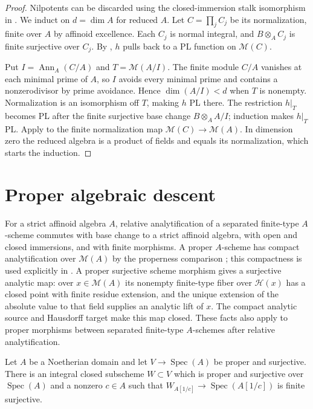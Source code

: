 \documentclass[11pt,a4paper]{amsart}
\begin{document}
\begin{proof}
Nilpotents can be discarded using the closed-immersion stalk isomorphism in . We induct on $d=\dim A$ for reduced $A$. Let $C=\prod_j C_j$ be its normalization, finite over $A$ by affinoid excellence. Each $C_j$ is normal integral, and $B\otimes_A C_j$ is finite surjective over $C_j$. By , $h$ pulls back to a PL function on $\mathcal M(C)$.

Put $I=\operatorname{Ann}_A(C/A)$ and $T=\mathcal M(A/I)$. The finite module $C/A$ vanishes at each minimal prime of $A$, so $I$ avoids every minimal prime and contains a nonzerodivisor by prime avoidance. Hence $\dim(A/I)<d$ when $T$ is nonempty. Normalization is an isomorphism off $T$, making $h$ PL there. The restriction $h|_T$ becomes PL after the finite surjective base change $B\otimes_A A/I$; induction makes $h|_T$ PL. Apply  to the finite normalization map $\mathcal M(C)\to\mathcal M(A)$. In dimension zero the reduced algebra is a product of fields and equals its normalization, which starts the induction.
\end{proof}

\section{Proper algebraic descent}\label{sec:proper-descent}

For a strict affinoid algebra $A$, relative analytification of a separated finite-type $A$-scheme commutes with base change to a strict affinoid algebra, with open and closed immersions, and with finite morphisms. A proper $A$-scheme has compact analytification over $\mathcal M(A)$ by the properness comparison \cite[Proposition~2.6.9]{Berkovich93Etale}; this compactness is used explicitly in \cite[proof of Theorem~1.3.1]{Berkovich15Finiteness}. A proper surjective scheme morphism gives a surjective analytic map: over $x\in\mathcal M(A)$ its nonempty finite-type fiber over $\mathscr H(x)$ has a closed point with finite residue extension, and the unique extension of the absolute value to that field supplies an analytic lift of $x$. The compact analytic source and Hausdorff target make this map closed. These facts also apply to proper morphisms between separated finite-type $A$-schemes after relative analytification.

\begin{lemma}\label{lem:generic-multisection}
Let $A$ be a Noetherian domain and let $V\to\operatorname{Spec}(A)$ be proper and surjective. There is an integral closed subscheme $W\subset V$ which is proper and surjective over $\operatorname{Spec}(A)$ and a nonzero $c\in A$ such that $W_{A[1/c]}\to\operatorname{Spec}(A[1/c])$ is finite surjective.
\end{lemma}
\end{document}
